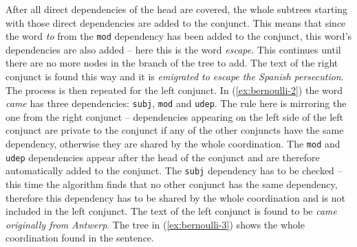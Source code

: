 \vspace{2ex}
\begin{exe}
\ex\label{ex:bernoulli-2}
\end{exe}
\vspace{1ex}

After all direct dependencies of the head are covered, the whole subtrees starting with those direct dependencies are added to the conjunct. This means that since the word \textsl{to} from the \texttt{mod} dependency has been added to the conjunct, this word's dependencies are also added -- here this is the word \textsl{escape}. This continues until there are no more nodes in the branch of the tree to add. The text of the right conjunct is found this way and it is \textsl{emigrated to escape the Spanish persecution}. The process is then repeated for the left conjunct. In (\ref{ex:bernoulli-2}) the word \textsl{came} has three dependencies: \texttt{subj}, \texttt{mod} and \texttt{udep}. The rule here is mirroring the one from the right conjunct -- dependencies appearing on the left side of the left conjunct are private to the conjunct if any of the other conjuncts have the same dependency, otherwise they are shared by the whole coordination. The \texttt{mod} and \texttt{udep} dependencies appear after the head of the conjunct and are therefore automatically added to the conjunct. The \texttt{subj} dependency has to be checked -- this time the algorithm finds that no other conjunct has the same dependency, therefore this dependency has to be shared by the whole coordination and is not included in the left conjunct. The text of the left conjunct is found to be \textsl{came originally from Antwerp}. The tree in (\ref{ex:bernoulli-3}) shows the whole coordination found in the sentence. 

